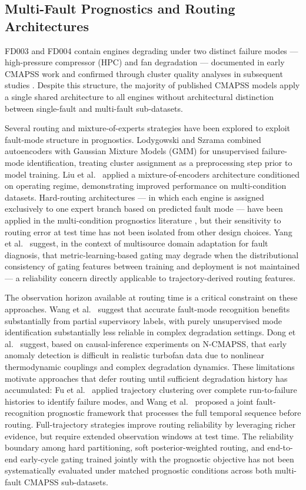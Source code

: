\documentclass[review,12pt]{elsarticle}
\begin{document}
\subsection{Multi-Fault Prognostics and Routing Architectures}

FD003 and FD004 contain engines degrading under two distinct failure modes --- high-pressure compressor (HPC) and fan degradation --- documented in early CMAPSS work \cite{ref07} and confirmed through cluster quality analyses in subsequent studies \cite{ref35,ref36}. Despite this structure, the majority of published CMAPSS models apply a single shared architecture to all engines without architectural distinction between single-fault and multi-fault sub-datasets.

Several routing and mixture-of-experts strategies have been explored to exploit fault-mode structure in prognostics. Lodygowski and Szrama \cite{ref31} combined autoencoders with Gaussian Mixture Models (GMM) for unsupervised failure-mode identification, treating cluster assignment as a preprocessing step prior to model training. Liu et al.\ \cite{ref32} applied a mixture-of-encoders architecture conditioned on operating regime, demonstrating improved performance on multi-condition datasets. Hard-routing architectures --- in which each engine is assigned exclusively to one expert branch based on predicted fault mode --- have been applied in the multi-condition prognostics literature \cite{ref30}, but their sensitivity to routing error at test time has not been isolated from other design choices. Yang et al.\ \cite{ref44} suggest, in the context of multisource domain adaptation for fault diagnosis, that metric-learning-based gating may degrade when the distributional consistency of gating features between training and deployment is not maintained --- a reliability concern directly applicable to trajectory-derived routing features.

The observation horizon available at routing time is a critical constraint on these approaches. Wang et al.\ \cite{ref49} suggest that accurate fault-mode recognition benefits substantially from partial supervisory labels, with purely unsupervised mode identification substantially less reliable in complex degradation settings. Dong et al.\ \cite{ref48} suggest, based on causal-inference experiments on N-CMAPSS, that early anomaly detection is difficult in realistic turbofan data due to nonlinear thermodynamic couplings and complex degradation dynamics. These limitations motivate approaches that defer routing until sufficient degradation history has accumulated: Fu et al.\ \cite{ref46} applied trajectory clustering over complete run-to-failure histories to identify failure modes, and Wang et al.\ \cite{ref47} proposed a joint fault-recognition prognostic framework that processes the full temporal sequence before routing. Full-trajectory strategies improve routing reliability by leveraging richer evidence, but require extended observation windows at test time. The reliability boundary among hard partitioning, soft posterior-weighted routing, and end-to-end early-cycle gating trained jointly with the prognostic objective has not been systematically evaluated under matched prognostic conditions across both multi-fault CMAPSS sub-datasets.
\end{document}
